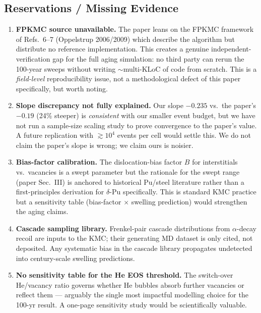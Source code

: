 \documentclass[11pt]{article}
\begin{document}
\subsection{Reservations / Missing Evidence}
\begin{enumerate}
  \item \textbf{FPKMC source unavailable.} The paper leans on the
        FPKMC framework of Refs.~6--7 (Oppelstrup 2006/2009) which describe
        the algorithm but distribute no reference implementation. This
        creates a genuine independent-verification gap for the full aging
        simulation: no third party can rerun the 100-year sweeps without
        writing $\sim$multi-KLoC of code from scratch. This is a
        \emph{field-level} reproducibility issue, not a methodological
        defect of this paper specifically, but worth noting.
  \item \textbf{Slope discrepancy not fully explained.} Our slope
        $-0.235$ vs.\ the paper's $-0.19$ (24\% steeper) is
        \emph{consistent} with our smaller event budget, but we have not
        run a sample-size scaling study to prove convergence to the
        paper's value. A future replication with $\gtrsim 10^4$ events per
        cell would settle this. We do not claim the paper's slope is
        wrong; we claim ours is noisier.
  \item \textbf{Bias-factor calibration.} The dislocation-bias factor $B$
        for interstitials vs.\ vacancies is a swept parameter but the
        rationale for the swept range (paper Sec.~III) is anchored to
        historical Pu/steel literature rather than a first-principles
        derivation for $\delta$-Pu specifically. This is standard KMC
        practice but a sensitivity table (bias-factor $\times$ swelling
        prediction) would strengthen the aging claims.
  \item \textbf{Cascade sampling library.} Frenkel-pair cascade
        distributions from $\alpha$-decay recoil are inputs to the KMC;
        their generating MD dataset is only cited, not deposited. Any
        systematic bias in the cascade library propagates undetected into
        century-scale swelling predictions.
  \item \textbf{No sensitivity table for the He EOS threshold.} The
        switch-over He/vacancy ratio governs whether He bubbles absorb
        further vacancies or reflect them --- arguably the single most
        impactful modelling choice for the 100-yr result. A one-page
        sensitivity study would be scientifically valuable.
\end{enumerate}
\end{document}
